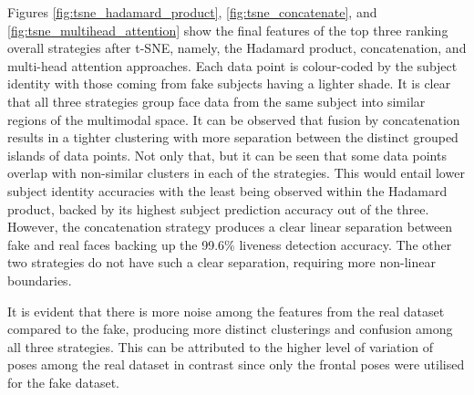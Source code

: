 \documentclass{mpaper}
\begin{document}
Figures \ref{fig:tsne_hadamard_product}, \ref{fig:tsne_concatenate}, and \ref{fig:tsne_multihead_attention} show the final features of the top three ranking overall strategies after t-SNE, namely, the Hadamard product, concatenation, and multi-head attention approaches. Each data point is colour-coded by the subject identity with those coming from fake subjects having a lighter shade. It is clear that all three strategies group face data from the same subject into similar regions of the multimodal space. It can be observed that fusion by concatenation results in a tighter clustering with more separation between the distinct grouped islands of data points. Not only that, but it can be seen that some data points overlap with non-similar clusters in each of the strategies. This would entail lower subject identity accuracies with the least being observed within the Hadamard product, backed by its highest subject prediction accuracy out of the three. However, the concatenation strategy produces a clear linear separation between fake and real faces backing up the 99.6\% liveness detection accuracy. The other two strategies do not have such a clear separation, requiring more non-linear boundaries.

It is evident that there is more noise among the features from the real dataset compared to the fake, producing more distinct clusterings and confusion among all three strategies. This can be attributed to the higher level of variation of poses among the real dataset in contrast since only the frontal poses were utilised for the fake dataset. 
\end{document}
